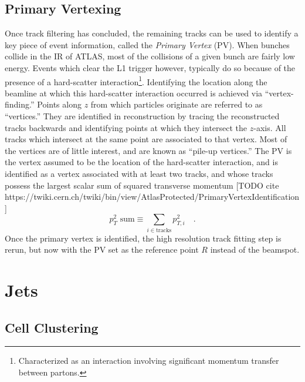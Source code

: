         \FloatBarrier
        \subsection{Primary Vertexing}

            Once track filtering has concluded,
                the remaining tracks can be used to identify a key piece of event information, 
                called the \textit{Primary Vertex} (PV).
            When bunches collide in the IR of ATLAS, most of the collisions of a given bunch are fairly low energy.
            Events which clear the L1 trigger however, typically do so because of the presence of a hard-scatter interaction\footnote{
                Characterized as an interaction involving significant momentum transfer between partons.}.
            Identifying the location along the beamline at which this hard-scatter interaction occurred is achieved via ``vertex-finding.''
            Points along $z$ from which particles originate are referred to as ``vertices.''
            They are identified in reconstruction by tracing the reconstructed tracks backwards
                and identifying points at which they intersect the $z$-axis.
            All tracks which intersect at the same point are associated to that vertex.
            Most of the vertices are of little interest, and are known as ``pile-up vertices.''
            The PV is the vertex assumed to be the location of the hard-scatter interaction,
                and is identified as a vertex associated with at least two tracks,
                and whose tracks possess the largest scalar sum of squared transverse momentum\cite{jet_energy_scale13TeV}
                [TODO cite https://twiki.cern.ch/twiki/bin/view/AtlasProtected/PrimaryVertexIdentification]
                \begin{equation}
                    p_T^2 \textrm{ sum}  \equiv \sum\limits_{i \in \textrm{tracks}} p_{T,i}^2 \quad.
                \end{equation}
            Once the primary vertex is identified, the high resolution track fitting step is rerun,
                but now with the PV set as the reference point $R$ instead of the beamspot.


    \FloatBarrier
    \section{Jets}

        \subsection{Cell Clustering}

